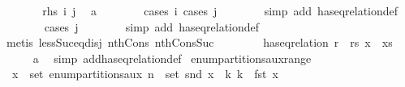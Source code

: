 \begin{isabellebody}
\ \ \ \ \isamarkupfalse%
\ \isamarkupfalse%
\ {\isachardoublequoteopen}{\isacharquery}{\kern0pt}rhs\ i\ j{\isachardoublequoteclose}\ \isamarkupfalse%
\ a\isanewline
\ \ \ \ \ \ \isamarkupfalse%
\ {\isacharparenleft}{\kern0pt}cases\ i{\isacharcomma}{\kern0pt}\ cases\ j{\isacharparenright}{\kern0pt}\isanewline
\ \ \ \ \ \ \isamarkupfalse%
\ {\isacharparenleft}{\kern0pt}simp\ add{\isacharcolon}{\kern0pt}\ has{\isacharunderscore}{\kern0pt}eq{\isacharunderscore}{\kern0pt}relation{\isacharunderscore}{\kern0pt}def{\isacharparenright}{\kern0pt}\isanewline
\ \ \ \ \ \ \isamarkupfalse%
\ {\isacharparenleft}{\kern0pt}cases\ j{\isacharparenright}{\kern0pt}\isanewline
\ \ \ \ \ \ \isamarkupfalse%
\ {\isacharparenleft}{\kern0pt}simp\ add{\isacharcolon}{\kern0pt}\ has{\isacharunderscore}{\kern0pt}eq{\isacharunderscore}{\kern0pt}relation{\isacharunderscore}{\kern0pt}def{\isacharparenright}{\kern0pt}{\isacharplus}{\kern0pt}\isanewline
\ \ \ \ \ \ \isamarkupfalse%
\ {\isacharparenleft}{\kern0pt}metis\ less{\isacharunderscore}{\kern0pt}Suc{\isacharunderscore}{\kern0pt}eq{\isacharunderscore}{\kern0pt}{}{\isacharunderscore}{\kern0pt}disj\ nth{\isacharunderscore}{\kern0pt}Cons{\isacharprime}{\kern0pt}\ nth{\isacharunderscore}{\kern0pt}Cons{\isacharunderscore}{\kern0pt}Suc{\isacharparenright}{\kern0pt}\isanewline
\ \ \isamarkupfalse%
\isanewline
\ \ \isamarkupfalse%
\ \isamarkupfalse%
\ {\isachardoublequoteopen}has{\isacharunderscore}{\kern0pt}eq{\isacharunderscore}{\kern0pt}relation\ {\isacharparenleft}{\kern0pt}r\ {\isacharhash}{\kern0pt}\ rs{\isacharparenright}{\kern0pt}\ {\isacharparenleft}{\kern0pt}x\ {\isacharhash}{\kern0pt}\ xs{\isacharparenright}{\kern0pt}{\isachardoublequoteclose}\isanewline
\ \ \ \ \isamarkupfalse%
\ a\ \isamarkupfalse%
\ {\isacharparenleft}{\kern0pt}simp\ add{\isacharcolon}{\kern0pt}has{\isacharunderscore}{\kern0pt}eq{\isacharunderscore}{\kern0pt}relation{\isacharunderscore}{\kern0pt}def{\isacharparenright}{\kern0pt}\isanewline
{}\isamarkupfalse%
%
\endisatagproof
{\isafoldproof}%
%
\isadelimproof
\isanewline
%
\endisadelimproof
\isanewline
{}\isamarkupfalse%
\ enum{\isacharunderscore}{\kern0pt}partitions{\isacharunderscore}{\kern0pt}aux{\isacharunderscore}{\kern0pt}range{\isacharcolon}{\kern0pt}\isanewline
\ \ {\isachardoublequoteopen}x\ {\isasymin}\ set\ {\isacharparenleft}{\kern0pt}enum{\isacharunderscore}{\kern0pt}partitions{\isacharunderscore}{\kern0pt}aux\ n{\isacharparenright}{\kern0pt}\ {\isasymLongrightarrow}\ set\ {\isacharparenleft}{\kern0pt}snd\ x{\isacharparenright}{\kern0pt}\ {\isacharequal}{\kern0pt}\ {\isacharbraceleft}{\kern0pt}k{\isachardot}{\kern0pt}\ k\ {\isacharless}{\kern0pt}\ fst\ x{\isacharbraceright}{\kern0pt}{\isachardoublequoteclose}\isanewline

\end{isabellebody}
